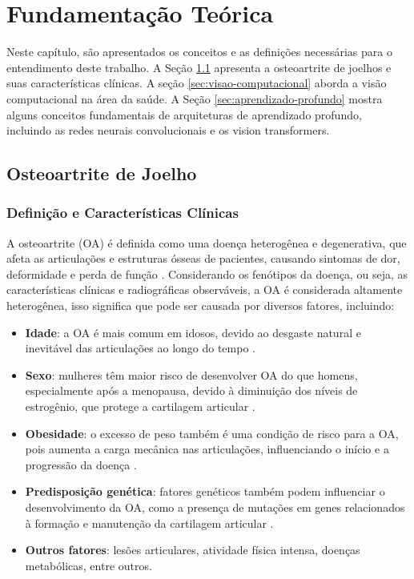 \chapter{Fundamentação Teórica}\label{cap:fundamentacao}

Neste capítulo, são apresentados os conceitos e as definições necessárias para o entendimento deste trabalho. A Seção \ref{sec:osteoartrite} apresenta a osteoartrite de joelhos e suas características clínicas. A seção \ref{sec:visao-computacional} aborda a visão computacional na área da saúde. A Seção \ref{sec:aprendizado-profundo} mostra alguns conceitos fundamentais de arquiteturas de aprendizado profundo, incluindo as redes neurais convolucionais e os vision transformers.


\section{Osteoartrite de Joelho}\label{sec:osteoartrite}

\subsection{Definição e Características Clínicas}

A osteoartrite (OA) é definida como uma doença heterogênea e degenerativa, que afeta as articulações e estruturas ósseas de pacientes, causando sintomas de dor, deformidade e perda de função \citep{Loeser2012}. Considerando os fenótipos da doença, ou seja, as características clínicas e radiográficas observáveis, a OA é considerada altamente heterogênea, isso significa que pode ser causada por diversos fatores, incluindo:

\begin{itemize}
    \item \textbf{Idade}: a OA é mais comum em idosos, devido ao desgaste natural e inevitável das articulações ao longo do tempo \citep{ShaneAnderson2010}.
    \item \textbf{Sexo}: mulheres têm maior risco de desenvolver OA do que homens, especialmente após a menopausa, devido à diminuição dos níveis de estrogênio, que protege a cartilagem articular \citep{Tschon2021}.
    \item \textbf{Obesidade}: o excesso de peso também é uma condição de risco para a OA, pois aumenta a carga mecânica nas articulações, influenciando o início e a progressão da doença \citep{PACCA2018}.
    \item \textbf{Predisposição genética}: fatores genéticos também podem influenciar o desenvolvimento da OA, como a presença de mutações em genes relacionados à formação e manutenção da cartilagem articular \citep{Spector2004}.
    \item \textbf{Outros fatores}: lesões articulares, atividade física intensa, doenças metabólicas, entre outros.
\end{itemize}

